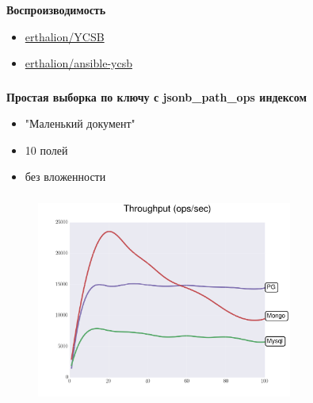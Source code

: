 \documentclass[18pt, compress, aspectratio=169]{beamer}
\begin{document}
\begin{frame}
    \frametitle{}
    \begin{center}
        \textbf{Воспроизводимость}
        \begin{itemize}[label={}]
            \item \href{https://github.com/erthalion/YCSB}{erthalion/YCSB}
            \item \href{https://github.com/erthalion/ansible-ycsb}{erthalion/ansible-ycsb}
        \end{itemize}
    \end{center}
\end{frame}

\begin{frame}
    \frametitle{}
    \begin{center}
        \textbf{Простая выборка по ключу с jsonb\_path\_ops индексом}
        \begin{itemize}[label={}]
            \item "Маленький документ"
            \item 10 полей
            \item без вложенности
        \end{itemize}
    \end{center}
\end{frame}

\begin{frame}
    \frametitle{}
    \begin{center}
    \begin{figure}
        \includegraphics[width=0.75\textwidth,center]{benchmarks/workload_c_jsonb_path_ops/throughput.png}
    \end{figure}
    \end{center}
\end{frame}
\end{document}
